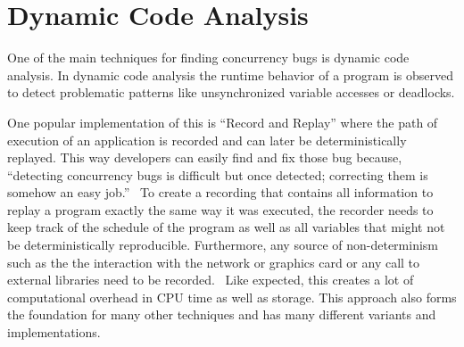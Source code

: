 \documentclass[conference]{IEEEtran}
\begin{document}
\section{Dynamic Code Analysis}
\label{sct:dynamic}

One of the main techniques for finding concurrency bugs is dynamic code analysis.
In dynamic code analysis the runtime behavior of a program is observed to detect problematic patterns like unsynchronized variable accesses or deadlocks.

One popular implementation of this is ``Record and Replay'' where the path of execution of an application is recorded and can later be deterministically replayed.
This way developers can easily find and fix those bug because, ``detecting concurrency bugs is difficult but once detected; correcting them is somehow an easy job.''~\cite{tchamgoue2012testing}
To create a recording that contains all information to replay a program exactly the same way it was executed, the recorder needs to keep track of the schedule of the program as well as all variables that might not be deterministically reproducible.
Furthermore, any source of non-determinism such as the the interaction with the network or graphics card or any call to external libraries need to be recorded.~\cite{lidbury2019sparse}
Like expected, this creates a lot of computational overhead in CPU time as well as storage.
This approach also forms the foundation for many other techniques and has many different variants and implementations.
\end{document}
